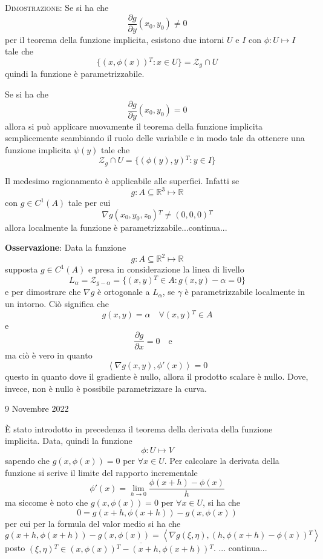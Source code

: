 \documentclass[a4paper]{extarticle}
\begin{document}
\vspace{2em}
\noindent
\normalfont \normalsize
\textsc{Dimostrazione}: Se si ha che
\[\dfrac{\partial g}{\partial y} (x_0,y_0) \neq 0\]
per il teorema della funzione implicita, esistono due intorni $U$ e $I$ con $\phi : U \longmapsto I$ tale che
\[\{(x,\phi(x)){^T : x \in U}\} = \mathcal{Z}_g \cap U\]
quindi la funzione è parametrizzabile.

\vspace{1em}
\noindent
Se si ha che
\[\dfrac{\partial g}{\partial y} (x_0,y_0) = 0\]
allora si può applicare nuovamente il teorema della funzione implicita semplicemente scambiando il ruolo delle variabile e in modo tale da ottenere una funzione implicita $\psi(y)$ tale che
\[\mathcal{Z}_g \cap U = \{(\phi(y),y){^T} : y \in I\}\]

\vspace{1em}
\noindent
Il medesimo ragionamento è applicabile alle superfici. Infatti se
\[g : A \subseteq \mathbb{R}^3 \longmapsto \mathbb{R}\]
con $g \in C^1(A)$ tale per cui
\[\nabla g(x_0,y_0,z_0){^T \neq (0,0,0){^T}}\]
allora localmente la funzione è parametrizzabile...continua...

\vspace{2em}
\noindent
\textbf{Osservazione}: Data la funzione
\[g : A \subseteq \mathbb{R}^2 \longmapsto \mathbb{R}\]
supposta $g \in C^1(A)$
e presa in considerazione la linea di livello
\[L_\alpha = \mathcal{Z}_{g-\alpha} = \{(x,y){^T} \in A : g(x,y) - \alpha = 0\}\]
e per dimostrare che $\nabla g$ è ortogonale a $L_\alpha$, se $\gamma$ è parametrizzabile localmente in un intorno. Ciò significa che
\[g(x,y) = \alpha \hspace{1em} \forall (x,y){^T} \in A\]
e 
\[\dfrac{\partial g}{\partial x} = 0 \hspace{1em} \text{e} \hspace{1em}\]
ma ciò è vero in quanto
\[\left<\nabla g(x,y), \phi'(x)\right> = 0\]
questo in quanto dove il gradiente è nullo, allora il prodotto scalare è nullo. Dove, invece, non è nullo è possibile parametrizzare la curva.

\newpage
\noindent
\begin{center}
    9 Novembre 2022
\end{center}
È stato introdotto in precedenza il teorema della derivata della funzione implicita. Data, quindi la funzione
\[\phi : U \longmapsto V\]
sapendo che $g(x,\phi(x))=0$ per $\forall x \in U$. Per calcolare la derivata della funzione si scrive il limite del rapporto incrementale
\[\phi'(x) = \lim_{h \to 0} \dfrac{\phi(x+h) - \phi(x)}{h}\]
ma siccome è noto che $g(x,\phi(x))=0$ per $\forall x \in U$, si ha che
\[0 = g(x+h,\phi(x+h)) - g(x,\phi(x))\]
per cui per la formula del valor medio si ha che
\[g(x+h,\phi(x+h)) - g(x,\phi(x)) = \left<\nabla g(\xi,\eta),(h,\phi(x+h)-\phi(x)){^T} \right>\]
posto $(\xi,\eta){^T} \in \overline{(x,\phi(x)){^T}-(x+h,\phi(x+h)){^T}}$.
... continua...
\end{document}
